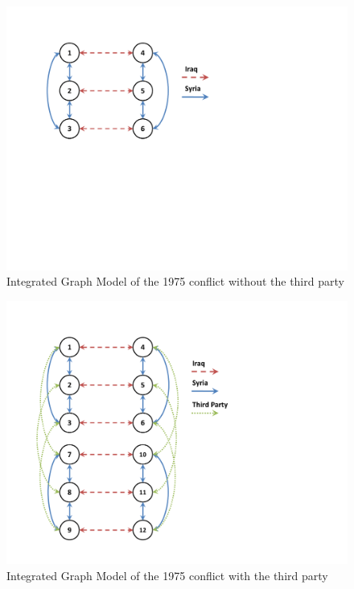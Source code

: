\documentclass[letterpaper,12pt,titlepage,oneside,final]{book}
\begin{document}
\begin{center}
\begin{figure}[H]
\centering
\includegraphics[scale=0.6]{PDF-IMG/IrSy1.pdf}

\caption{Integrated Graph Model of the 1975 conflict without the third party}

\label{fig:IrSyGM}
\end{figure}
\end{center}

\begin{center}
\begin{figure}[H]
\centering
\includegraphics[scale=0.5]{PDF-IMG/IrSy2.pdf}

\caption{Integrated Graph Model of the 1975 conflict with the third party}

\label{fig:IrSyGM2}
\end{figure}
\end{center}
\end{document}
